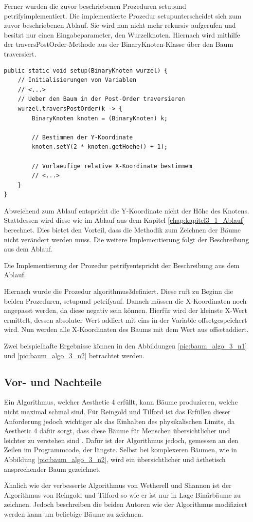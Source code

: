 Ferner wurden die zuvor beschriebenen Prozeduren \glqq setup\grqq und \glqq petrify\grqq implementiert. Die implementierte Prozedur
\glqq setup\grqq unterscheidet sich zum zuvor beschriebenen Ablauf. Sie wird nun nicht mehr rekursiv aufgerufen und besitzt 
nur einen Eingabeparameter, den Wurzelknoten. Hiernach wird mithilfe der \glqq traversPostOrder\grqq-Methode aus der 
BinaryKnoten-Klasse über den Baum traversiert.

\begin{lstlisting}[caption=Ausschnitt aus der setup-Prozedur, label=code:algo3_setup]
public static void setup(BinaryKnoten wurzel) {
    // Initialisierungen von Variablen
    // <...>
    // Ueber den Baum in der Post-Order traversieren
    wurzel.traversPostOrder(k -> {
        BinaryKnoten knoten = (BinaryKnoten) k;

        // Bestimmen der Y-Koordinate
        knoten.setY(2 * knoten.getHoehe() + 1);

        // Vorlaeufige relative X-Koordinate bestimmem
        // <...>
    }
}
\end{lstlisting}

Abweichend zum Ablauf entspricht die Y-Koordinate nicht der Höhe des Knotens. Stattdessen wird diese wie im 
Ablauf aus dem Kapitel \ref{chap:kapitel3_1_Ablauf} berechnet. Dies bietet den Vorteil, 
dass die Methodik zum Zeichnen der Bäume nicht verändert werden muss. Die weitere Implementierung folgt 
der Beschreibung aus dem Ablauf.

Die Implementierung der Prozedur \glqq petrify\grqq entspricht der Beschreibung aus dem Ablauf.

Hiernach wurde die Prozedur \glqq algorithmus3\grqq definiert. Diese ruft zu Beginn die beiden Prozeduren, 
\glqq setup\grqq und \glqq petrify\grqq auf. Danach müssen die X-Koordinaten noch angepasst werden, da diese 
negativ sein können. Hierfür wird der kleinste X-Wert ermittelt, dessen absoluter Wert 
addiert mit eins in der Variable \glqq offset\grqq gespeichert wird. Nun werden alle X-Koordinaten des 
Baums mit dem Wert aus \glqq offset\grqq addiert. 

Zwei beispielhafte Ergebnisse können in den Abbildungen \ref{pic:baum_algo_3_n1} 
und \ref{pic:baum_algo_3_n2} betrachtet werden. 


\subsection{Vor- und Nachteile}

Ein Algorithmus, welcher Aesthetic 4 erfüllt, kann Bäume produzieren, welche nicht maximal schmal sind. 
Für Reingold und Tilford ist das Erfüllen dieser Anforderung jedoch wichtiger als das Einhalten des physikalischen Limits, 
da Aesthetic 4 dafür sorgt, dass diese Bäume für Menschen übersichtlicher und leichter zu verstehen sind \cite[]{q2}. Dafür ist der Algorithmus 
jedoch, gemessen an den Zeilen im Programmcode, der längste. Selbst bei komplexeren Bäumen, wie in Abbildung \ref{pic:baum_algo_3_n2},
wird ein übersichtlicher und ästhetisch ansprechender Baum gezeichnet. 

Ähnlich wie der verbesserte Algorithmus von Wetherell und Shannon ist der Algorithmus von Reingold und Tilford so wie er ist nur in Lage
Binärbäume zu zeichnen. Jedoch beschreiben die beiden Autoren wie der Algorithmus modifiziert werden kann um beliebige Bäume zu zeichnen.

